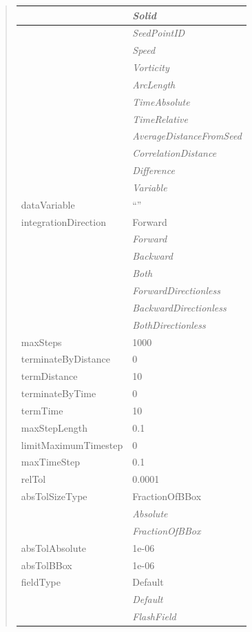 \documentclass[letterpaper,10pt,english]{sphinxmanual}
\begin{document}
\begin{quote}
\begin{longtable}{|l|l|}
\\
\hline & 
\emph{Solid}
\\
\hline & 
\emph{SeedPointID}
\\
\hline & 
\emph{Speed}
\\
\hline & 
\emph{Vorticity}
\\
\hline & 
\emph{ArcLength}
\\
\hline & 
\emph{TimeAbsolute}
\\
\hline & 
\emph{TimeRelative}
\\
\hline & 
\emph{AverageDistanceFromSeed}
\\
\hline & 
\emph{CorrelationDistance}
\\
\hline & 
\emph{Difference}
\\
\hline & 
\emph{Variable}
\\
\hline
dataVariable
 & 
``''
\\
\hline
integrationDirection
 & 
Forward
\\
\hline & 
\emph{Forward}
\\
\hline & 
\emph{Backward}
\\
\hline & 
\emph{Both}
\\
\hline & 
\emph{ForwardDirectionless}
\\
\hline & 
\emph{BackwardDirectionless}
\\
\hline & 
\emph{BothDirectionless}
\\
\hline
maxSteps
 & 
1000
\\
\hline
terminateByDistance
 & 
0
\\
\hline
termDistance
 & 
10
\\
\hline
terminateByTime
 & 
0
\\
\hline
termTime
 & 
10
\\
\hline
maxStepLength
 & 
0.1
\\
\hline
limitMaximumTimestep
 & 
0
\\
\hline
maxTimeStep
 & 
0.1
\\
\hline
relTol
 & 
0.0001
\\
\hline
absTolSizeType
 & 
FractionOfBBox
\\
\hline & 
\emph{Absolute}
\\
\hline & 
\emph{FractionOfBBox}
\\
\hline
absTolAbsolute
 & 
1e-06
\\
\hline
absTolBBox
 & 
1e-06
\\
\hline
fieldType
 & 
Default
\\
\hline & 
\emph{Default}
\\
\hline & 
\emph{FlashField}

\end{longtable}
\end{quote}
\end{document}
